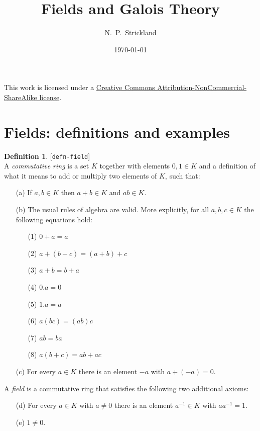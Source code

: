 \documentclass{amsart}
\newcommand{\lbl}[1]{\label{#1}\textup{[\texttt{#1}]}\ \\}
\newcommand{\lbl}{\label}
\renewcommand{\:}{\colon}
\theoremstyle{definition}
\newtheorem{definition}[theorem]{Definition}
\begin{document}
\title{Fields and Galois Theory}
\author{N.~P.~Strickland}
\address{
Department of Pure Mathematics\\
University of Sheffield\\
Sheffield S3 7RH\\
UK
}
\date{\today}


\maketitle 

\begin{center}
 This work is licensed under a 
 \href{https://creativecommons.org/licenses/by-nc-sa/3.0/deed.en}{
  Creative Commons Attribution-NonCommercial-ShareAlike license}.
 
 \bigskip

 \doclicenseImage 
\end{center}

\section{Fields: definitions and examples}
\label{sec-fields}

\begin{definition}\lbl{defn-field}
 A \emph{commutative ring} is a set $K$ together with elements
 $0,1\in K$ and a definition of what it means to add or
 multiply two elements of $K$, such that:
 \begin{enumerate}
  \item[(a)] If $a,b\in K$ then $a+b\in K$ and $ab\in K$.
  \item[(b)] The usual rules of algebra are valid.  More
   explicitly, for all $a,b,c\in K$ the following equations
   hold: 
   \begin{itemize}
    \item[(1)] $0+a=a$
    \item[(2)] $a+(b+c)=(a+b)+c$
    \item[(3)] $a+b=b+a$
    \item[(4)] $0.a=0$
    \item[(5)] $1.a=a$
    \item[(6)] $a(bc)=(ab)c$
    \item[(7)] $ab=ba$
    \item[(8)] $a(b+c)=ab+ac$
   \end{itemize}
  \item[(c)] For every $a\in K$ there is an element $-a$ with
   $a+(-a)=0$.
 \end{enumerate}
 A \emph{field} is a commutative ring that satisfies the following two
 additional axioms:
 \begin{enumerate}
  \item[(d)] For every $a\in K$ with $a\neq 0$ there is an
   element $a^{-1}\in K$ with $aa^{-1}=1$.
  \item[(e)] $1\neq 0$.
 \end{enumerate}
\end{definition}
\end{document}
